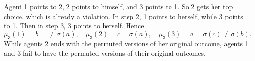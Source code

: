 \begin{example}
\begin{center}
	\end{center}
	Agent 1 points to 2, 2 points to himself, and 3 points to 1. So 2 gets her top choice, which is already a violation. In step 2, 1 points to herself, while 3 points to 1. Then in step 3, 3 points to herself.
	Hence \[
		\mu_3(1) = b = \ne \sigma(a), \quad \mu_3(2) = c = \sigma(a), \quad \mu_3(3) = a = \sigma(c) \ne \sigma(b)
	.\] 
	While agents 2 ends with the permuted versions of her original outcome, agents 1 and 3 fail to have the permuted versions of their original outcomes.
\end{example}

